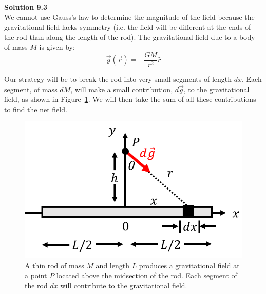 \begin{framed}
\textbf{Solution 9.3}\\
We cannot use Gauss's law to determine the magnitude of the field because the gravitational field lacks symmetry (i.e. the field will be different at the ends of the rod than along the length of the rod). The gravitational field due to a body of mass $M$ is given by:
\begin{equation}
\vec g(\vec r)=-\frac{GM}{r^2}\hat{r}
\end{equation}

Our strategy will be to break the rod into very small segments of length $dx$. Each segment, of mass $dM$, will make a small contribution, $d\vec g$, to the gravitational field, as shown in Figure~\ref{fig:gravity:rodfieldsoln}. We will then take the sum of all these contributions to find the net field.

\begin{figure}[!htbp]
\centering
\includegraphics[width=0.5\linewidth]{files/rodfieldsoln-414a994c752a5af9ba19615e5119f9df.png}
\caption[]{A thin rod of mass $M$ and length $L$ produces a gravitational field at a point $P$ located above the midsection of the rod. Each segment of the rod $dx$ will contribute to the gravitational field.}
\label{fig:gravity:rodfieldsoln}
\end{figure}


\end{framed}
